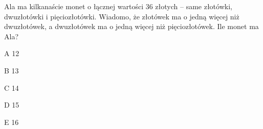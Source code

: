 \begin{tresc}
Ala ma kilkanaście monet o łącznej wartości 36 złotych – same złotówki, dwuzłotówki i pięciozłotówki. Wiadomo, że złotówek ma o jedną więcej niż dwuzłotówek, a dwuzłotówek ma o jedną więcej niż pięciozłotówek. Ile monet ma Ala?
\end{tresc}
\begin{wariant}{A} 12 \end{wariant}
\begin{wariant}{B} 13 \end{wariant}
\begin{wariant}{C} 14 \end{wariant}
\begin{wariant}{D} 15 \end{wariant}
\begin{wariant}{E} 16 \end{wariant}
